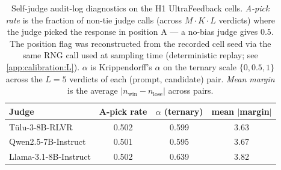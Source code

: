 \begin{table}[htbp]
\centering
\small
\caption{Self-judge audit-log diagnostics on the H1 UltraFeedback cells. \emph{A-pick rate} is the fraction of non-tie judge calls (across $M\cdot K\cdot L$ verdicts) where the judge picked the response in position A — a no-bias judge gives $0.5$. The position flag was reconstructed from the recorded cell seed via the same RNG call used at sampling time (deterministic replay; see \cref{app:calibration:L}). $\alpha$ is Krippendorff's $\alpha$ on the ternary scale $\{0,0.5,1\}$ across the $L{=}5$ verdicts of each (prompt, candidate) pair. \emph{Mean margin} is the average $|n_{\text{win}} - n_{\text{lose}}|$ across pairs.}
\label{tab:appendix_position_bias}
\begin{tabular}{lccc}
\toprule
Judge & A-pick rate & $\alpha$ (ternary) & mean $|$margin$|$ \\
\midrule
Tülu-3-8B-RLVR & 0.502 & 0.599 & 3.63 \\  %
Qwen2.5-7B-Instruct & 0.501 & 0.595 & 3.67 \\  %
Llama-3.1-8B-Instruct & 0.502 & 0.639 & 3.82 \\  %
\bottomrule
\end{tabular}
\end{table}